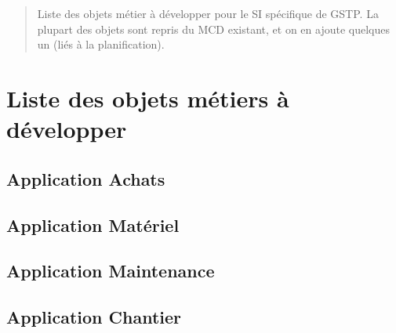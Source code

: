 \documentclass[a4paper]{article}
\begin{document}
\maketitle

\begin{abstract}
Liste des objets métier à développer pour le SI spécifique de GSTP. La
plupart des objets sont repris du MCD existant, et on en ajoute quelques
un (liés à la planification).
\end{abstract}

\section{Liste des objets métiers à développer}

\subsection{Application Achats}

\subsection{Application Matériel}

\subsection{Application Maintenance}

\subsection{Application Chantier}
\end{document}

